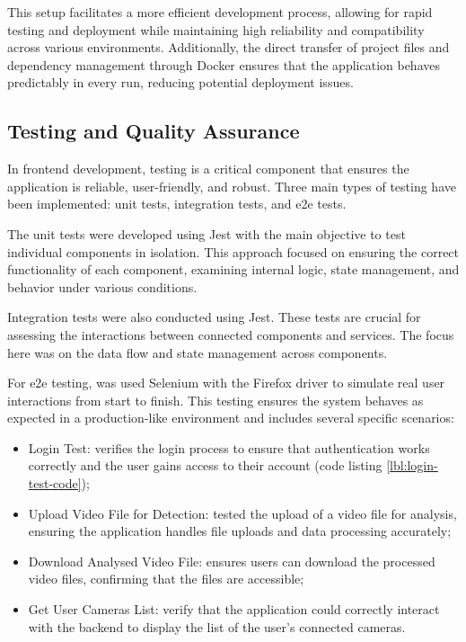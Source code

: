 This setup facilitates a more efficient development process, allowing for rapid testing and deployment while maintaining 
high reliability and compatibility across various environments. Additionally, the direct transfer of project files 
and dependency management through Docker ensures that the application behaves predictably in every run, reducing 
potential deployment issues.
\subsection{Testing and Quality Assurance}

In frontend development, testing is a critical component that ensures the application is reliable, 
user-friendly, and robust. Three main types of testing have been implemented: unit tests, integration tests, 
and \ac{e2e} tests.


The unit tests were developed using Jest with the main objective to test individual components in isolation. 
This approach focused on ensuring the correct functionality of each component, examining internal logic, state 
management, and behavior under various conditions.

Integration tests were also conducted using Jest. These tests are crucial for assessing the interactions between 
connected components and services. The focus here was on the data flow and state management across components.

For \ac{e2e} testing, was used Selenium with the Firefox driver to simulate real user interactions from start to finish. 
This testing ensures the system behaves as expected in a production-like environment and includes several specific 
scenarios:

\begin{itemize}
    \item Login Test: verifies the login process to ensure that authentication works correctly 
    and the user gains access to their account (code listing \ref{lbl:login-test-code});
    \item Upload Video File for Detection: tested the upload of a video file for 
    analysis, ensuring the application handles file uploads and data processing accurately;
    \item Download Analysed Video File: ensures users can download the processed video files, 
    confirming that the files are accessible;
    \item Get User Cameras List: verify that the application could correctly interact with the backend to 
    display the list of the user's connected cameras.
\end{itemize}

